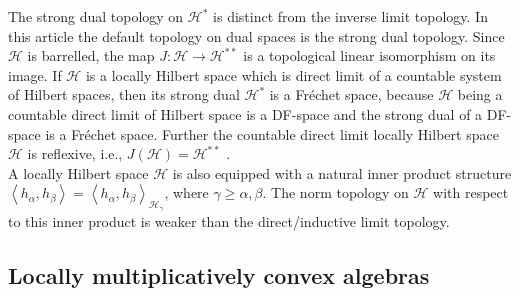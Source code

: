 \documentclass[10pt]{article}
\theoremstyle{definition}
\begin{document}
	The strong dual topology on $\mathcal H^*$ is distinct from the inverse limit topology. In this article the default topology on dual spaces is the strong dual topology. Since $\mathcal H$ is barrelled, the map $J:\mathcal H\to \mathcal H^{**}$ is a topological linear isomorphism on its image. If $\mathcal H$ is a locally Hilbert space which is direct limit of a countable system of Hilbert spaces, then its strong dual $\mathcal H^*$  is a Fr\'echet space, because $\mathcal H$ being a countable direct limit of Hilbert space is a DF-space \cite[Th. 12.4.8]{Jarchow} and the strong dual of a DF-space is a Fr\'echet space. Further the countable direct limit locally Hilbert space $\mathcal H$ is reflexive, i.e., $J(\mathcal H)=\mathcal H^{**}$ \cite[Prop. 11.4.5(e)]{Jarchow}. \\
	A locally Hilbert space $\mathcal H$ is also equipped with a natural inner product structure $\left<h_\alpha, h_\beta\right>=\left<h_\alpha,h_\beta\right>_{\mathcal H_\gamma}$, where $\gamma\geq \alpha, \beta$. The norm topology on $\mathcal H$ with respect to this inner product is weaker than the direct/inductive limit topology.
	\subsection{Locally multiplicatively convex algebras}
	
\end{document}
